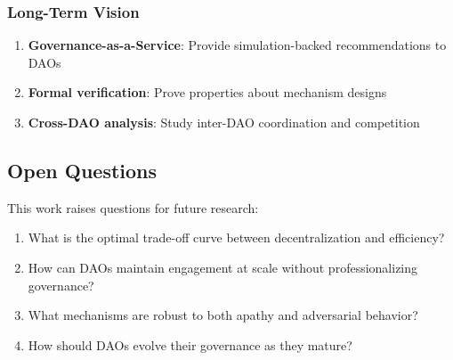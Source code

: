 \subsubsection{Long-Term Vision}

\begin{enumerate}
    \item \textbf{Governance-as-a-Service}: Provide simulation-backed recommendations to DAOs
    \item \textbf{Formal verification}: Prove properties about mechanism designs
    \item \textbf{Cross-DAO analysis}: Study inter-DAO coordination and competition
\end{enumerate}

\subsection{Open Questions}

This work raises questions for future research:

\begin{enumerate}
    \item What is the optimal trade-off curve between decentralization and efficiency?
    \item How can DAOs maintain engagement at scale without professionalizing governance?
    \item What mechanisms are robust to both apathy and adversarial behavior?
    \item How should DAOs evolve their governance as they mature?
\end{enumerate}
